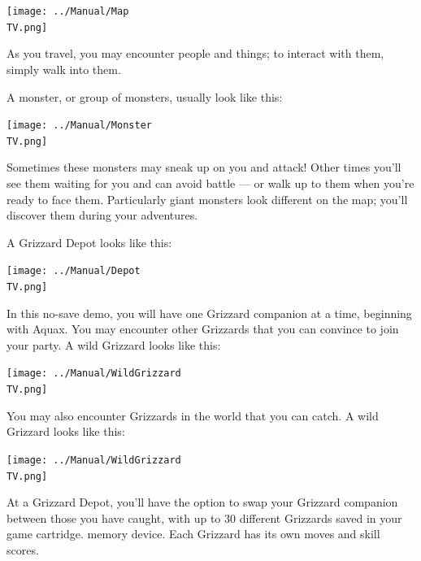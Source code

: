 \documentclass[10pt,twocolumn,openany,article]{memoir}
\newcommand\TV{NTSC}
\newcommand\TV{PAL}
\newcommand\TV{SECAM}
\begin{document}
\begin{center}
  \texttt{[image: ../Manual/Map\\TV.png]}
\end{center}

As you  travel, you may  encounter people  and things; to  interact with
them, simply walk into them.

A monster, or group of monsters, usually look like this:

\begin{center}
  \texttt{[image: ../Manual/Monster\\TV.png]}
\end{center}

Sometimes these  monsters may sneak  up on  you and attack!  Other times
you'll see them waiting  for you and can avoid battle ---  or walk up to
them when  you're ready to  face them. Particularly giant  monsters look
different on the map; you'll discover them during your adventures.

A Grizzard Depot looks like this:

\begin{center}
  \texttt{[image: ../Manual/Depot\\TV.png]}
\end{center}

\ifdefined\NOSAVE

In this  no-save demo, you will  have one Grizzard companion  at a time,
beginning with  Aquax. You  may encounter other  Grizzards that  you can
convince to join your party. A wild Grizzard looks like this:

\begin{center}
  \texttt{[image: ../Manual/WildGrizzard\\TV.png]}
\end{center}

\else

You may also encounter Grizzards in the world that you can catch. A wild
Grizzard looks like this:

\begin{center}
  \texttt{[image: ../Manual/WildGrizzard\\TV.png]}
\end{center}

At  a Grizzard  Depot,  you'll have  the option  to  swap your  Grizzard
companion  between  those you  have  caught,  with  up to  30  different
Grizzards saved  in your  \ifdefined\ATARIAGESAVE game  cartridge. \else
memory device. \fi Each Grizzard has its own moves and skill scores.
\end{document}
